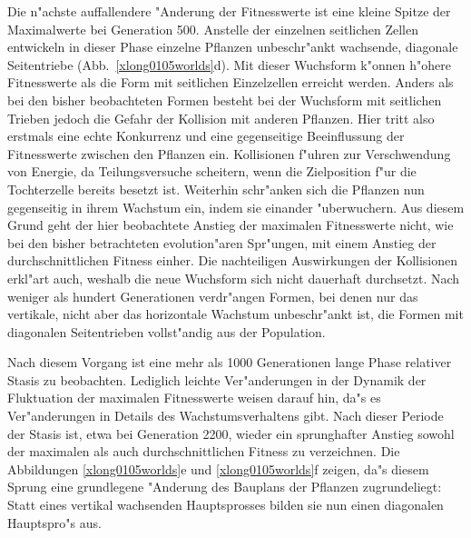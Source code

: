 Die n"achste auffallendere "Anderung der Fitnesswerte ist eine kleine Spitze der Maximalwerte
bei Generation 500. Anstelle der einzelnen seitlichen Zellen entwickeln in dieser Phase
einzelne Pflanzen unbeschr"ankt wachsende, diagonale Seitentriebe (Abb.\ \ref{xlong0105worlds}d).
Mit dieser Wuchsform k"onnen h"ohere Fitnesswerte als die Form mit seitlichen Einzelzellen erreicht
werden. Anders als bei den bisher beobachteten Formen besteht bei der Wuchsform mit seitlichen
Trieben jedoch die Gefahr der Kollision mit anderen Pflanzen. Hier tritt also erstmals eine echte
Konkurrenz und eine gegenseitige Beeinflussung der Fitnesswerte zwischen den Pflanzen ein.
Kollisionen f"uhren zur Verschwendung von Energie, da Teilungsversuche scheitern, wenn die
Zielposition f"ur die Tochterzelle bereits besetzt ist. Weiterhin schr"anken sich die Pflanzen
nun gegenseitig in ihrem Wachstum ein, indem sie einander "uberwuchern. Aus diesem Grund geht der
hier beobachtete Anstieg der maximalen Fitnesswerte nicht, wie bei den bisher betrachteten
evolution"aren Spr"ungen, mit einem Anstieg der durchschnittlichen Fitness einher. Die nachteiligen
Auswirkungen der Kollisionen erkl"art auch, weshalb die neue Wuchsform sich nicht dauerhaft
durchsetzt. Nach weniger als hundert Generationen verdr"angen Formen, bei denen nur das vertikale,
nicht aber das horizontale Wachstum unbeschr"ankt ist, die Formen mit diagonalen Seitentrieben
vollst"andig aus der Population.

Nach diesem Vorgang ist eine mehr als 1000 Generationen lange Phase relativer Stasis zu beobachten.
Lediglich leichte Ver"anderungen in der Dynamik der Fluktuation der maximalen Fitnesswerte weisen
darauf hin, da"s es Ver"anderungen in Details des Wachstumsverhaltens gibt. Nach dieser Periode
der Stasis ist, etwa bei Generation 2200, wieder ein sprunghafter Anstieg sowohl der maximalen als
auch durchschnittlichen Fitness zu verzeichnen. Die Abbildungen \ref{xlong0105worlds}e und
\ref{xlong0105worlds}f zeigen, da"s diesem Sprung eine grundlegene "Anderung des Bauplans der
Pflanzen zugrundeliegt: Statt eines vertikal wachsenden Hauptsprosses bilden sie nun einen
diagonalen Hauptspro"s aus.

